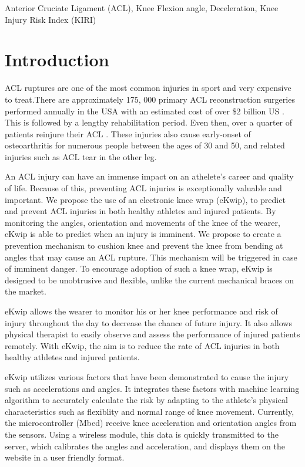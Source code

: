 \documentclass{sig-alternate}
\begin{document}
\begin{keywords}
	Anterior Cruciate Ligament (ACL),  Knee Flexion angle, Deceleration, Knee Injury Risk Index (KIRI)
\end{keywords}

\section{Introduction}
\label{sec:intro}
ACL ruptures are one of the most common injuries in sport and very expensive to treat.There are approximately 175, 000 primary ACL reconstruction surgeries performed annually in the USA with an estimated cost of over \$2 billion US \cite{yu2007mechanisms}. This is followed by a lengthy rehabilitation period. Even then, over a quarter of patients reinjure their ACL \cite{stevenson1998gender}. These injuries also cause early-onset of osteoarthritis for numerous people between the ages of 30 and 50, and related injuries such as ACL tear in the other leg.

An ACL injury can have an immense impact on an athelete's career and quality of life. Because of this, preventing ACL injuries is exceptionally valuable and important. We propose the use of an electronic knee wrap (eKwip), to predict and prevent ACL injuries in both healthy athletes and injured patients. By monitoring the angles, orientation and movements of the knee of the wearer, eKwip is able to predict when an injury is imminent. We propose to create a prevention mechanism to cushion knee and prevent the knee from bending at angles that may cause an ACL rupture. This mechanism will be triggered in case of imminent danger. To encourage adoption of such a knee wrap, eKwip is designed to be unobtrusive and flexible, unlike the current mechanical braces on the market.

eKwip allows the wearer to monitor his or her knee performance and risk of injury throughout the day to decrease the chance of future injury. It also allows physical therapist to easily observe and assess the performance of injured patients remotely. With eKwip, the aim is to reduce the rate of ACL injuries in both healthy athletes and injured patients.

eKwip utilizes various factors that have been demonstrated to cause the injury such as accelerations and angles. It integrates these factors with machine learning algorithm to accurately calculate the risk by adapting to the athlete's physical characteristics such as flexiblity and normal range of knee movement. Currently, the microcontroller (Mbed) receive knee acceleration and orientation angles from the sensors. Using a wireless module, this data is quickly transmitted to the server, which calibrates the angles and acceleration, and displays them on the website in a user friendly format.
\end{document}

